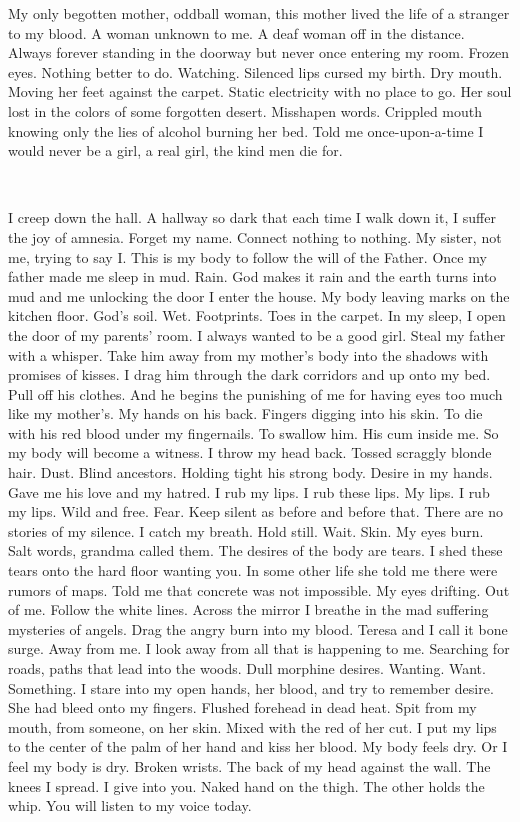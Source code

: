 \documentclass[
]{memoir}
\begin{document}
My only begotten mother, oddball woman, this mother lived the life of a
stranger to my blood. A woman unknown to me. A deaf woman off in the
distance. Always forever standing in the doorway but never once entering
my room. Frozen eyes. Nothing better to do. Watching. Silenced lips
cursed my birth. Dry mouth. Moving her feet against the carpet. Static
electricity with no place to go. Her soul lost in the colors of some
forgotten desert. Misshapen words. Crippled mouth knowing only the lies
of alcohol burning her bed. Told me once-upon-a-time I would never be a
girl, a real girl, the kind men die for.

~

I creep down the hall. A hallway so dark that each time I walk down it,
I suffer the joy of amnesia. Forget my name. Connect nothing to nothing.
My sister, not me, trying to say I. This is my body to follow the will
of the Father. Once my father made me sleep in mud. Rain. God makes it
rain and the earth turns into mud and me unlocking the door I enter the
house. My body leaving marks on the kitchen floor. God's soil. Wet.
Footprints. Toes in the carpet. In my sleep, I open the door of my
parents' room. I always wanted to be a good girl. Steal my father with a
whisper. Take him away from my mother's body into the shadows with
promises of kisses. I drag him through the dark corridors and up onto my
bed. Pull off his clothes. And he begins the punishing of me for having
eyes too much like my mother's. My hands on his back. Fingers digging
into his skin. To die with his red blood under my fingernails. To
swallow him. His cum inside me. So my body will become a witness. I
throw my head back. Tossed scraggly blonde hair. Dust. Blind ancestors.
Holding tight his strong body. Desire in my hands. Gave me his love and
my hatred. I rub my lips. I rub these lips. My lips. I rub my lips. Wild
and free. Fear. Keep silent as before and before that. There are no
stories of my silence. I catch my breath. Hold still. Wait. Skin. My
eyes burn. Salt words, grandma called them. The desires of the body are
tears. I shed these tears onto the hard floor wanting you. In some other
life she told me there were rumors of maps. Told me that concrete was
not impossible. My eyes drifting. Out of me. Follow the white lines.
Across the mirror I breathe in the mad suffering mysteries of angels.
Drag the angry burn into my blood. Teresa and I call it bone surge. Away
from me. I look away from all that is happening to me. Searching for
roads, paths that lead into the woods. Dull morphine desires. Wanting.
Want. Something. I stare into my open hands, her blood, and try to
remember desire. She had bleed onto my fingers. Flushed forehead in dead
heat. Spit from my mouth, from someone, on her skin. Mixed with the red
of her cut. I put my lips to the center of the palm of her hand and kiss
her blood. My body feels dry. Or I feel my body is dry. Broken wrists.
The back of my head against the wall. The knees I spread. I give into
you. Naked hand on the thigh. The other holds the whip. You will listen
to my voice today.
\end{document}

